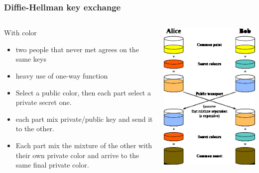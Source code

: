 \begin{frame}
\frametitle{Diffie-Hellman key exchange}
\begin{columns}[c]
\begin{block}{With color}
\begin{itemize}
\item two people that never met agrees on the same keys
\item heavy use of one-way function
\item Select a public color, then each part select a private secret one.
\item each part mix private/public key and send it to the other.
\item Each part mix the mixture of the other with their own private color and
arrive to the same final private color.
\end{itemize}
\end{block}
\includegraphics[height=.8\textheight]{./materials/diffie-hellman}
\end{columns}
\end{frame}
